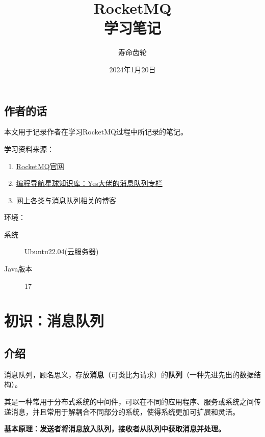 \documentclass[11pt, a4paper, oneside]{ctexbook}
\title{{\Huge{\textbf{RocketMQ}}}\\学习笔记}
\author{寿命齿轮}
\date{2024年1月20日}
\let\kaishu\relax                               %
\begin{document}
\maketitle

\newpage                    %
\setcounter{page}{1}        %
\section*{作者的话}
本文用于记录作者在学习RocketMQ过程中所记录的笔记。

学习资料来源：
\begin{enumerate}
  \item \href{https://rocketmq.apache.org/zh/}{RocketMQ官网}
  \item \href{https://wx.zsxq.com/dweb2/index/footprint/544814425818214}{编程导航星球知识库：Yes大佬的消息队列专栏}
  \item 网上各类与消息队列相关的博客
\end{enumerate}

环境：
\begin{description}
  \item[系统] Ubuntu22.04(云服务器)
  \item[Java版本] 17
\end{description}

\newpage                    %
\setcounter{page}{1}        %
\tableofcontents            %

\newpage                    %
\setcounter{page}{1}        %

\chapter{初识：消息队列}
\section{介绍}
消息队列，顾名思义，存放\textbf{消息}（可类比为请求）的\textbf{队列}（一种先进先出的数据结构）。

其是一种常用于分布式系统的中间件，可以在不同的应用程序、服务或系统之间传递消息，并且常用于解耦合不同部分的系统，使得系统更加可扩展和灵活。

{\bfseries\kaishu 基本原理：发送者将消息放入队列，接收者从队列中获取消息并处理。}
\end{document}
